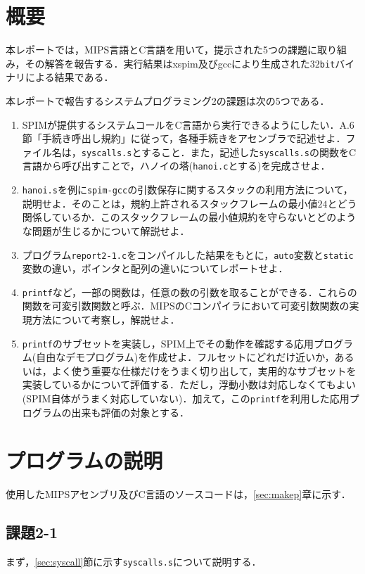 \section{概要} \label{sec:abstract}
本レポートでは，MIPS言語とC言語を用いて，提示された5つの課題に取り組み，その解答を報告する．実行結果はxspim及びgccにより生成された$32$\verb|bit|バイナリによる結果である．

本レポートで報告するシステムプログラミング2の課題は次の5つである．
\begin{enumerate}
\item SPIMが提供するシステムコールをC言語から実行できるようにしたい．A.6節「手続き呼出し規約」に従って，各種手続きをアセンブラで記述せよ．ファイル名は，\verb|syscalls.s|とすること．\cite{book:assembly}また，記述した\verb|syscalls.s|の関数をC言語から呼び出すことで，ハノイの塔(\verb|hanoi.c|とする)を完成させよ．
\item \verb|hanoi.s|を例に\verb|spim-gcc|の引数保存に関するスタックの利用方法について，説明せよ．そのことは，規約上許されるスタックフレームの最小値$24$とどう関係しているか．このスタックフレームの最小値規約を守らないとどのような問題が生じるかについて解説せよ．
\item プログラム\verb|report2-1.c|をコンパイルした結果をもとに，\verb|auto|変数と\verb|static|変数の違い，ポインタと配列の違いについてレポートせよ．
\item \verb|printf|など，一部の関数は，任意の数の引数を取ることができる．これらの関数を可変引数関数と呼ぶ．MIPSのCコンパイラにおいて可変引数関数の実現方法について考察し，解説せよ．
\item \verb|printf|のサブセットを実装し，SPIM上でその動作を確認する応用プログラム(自由なデモプログラム)を作成せよ．フルセットにどれだけ近いか，あるいは，よく使う重要な仕様だけをうまく切り出して，実用的なサブセットを実装しているかについて評価する．ただし，浮動小数は対応しなくてもよい(SPIM自体がうまく対応していない)．加えて，この\verb|printf|を利用した応用プログラムの出来も評価の対象とする．
\end{enumerate}


\section{プログラムの説明}\label{sec:capp}
使用したMIPSアセンブリ及びC言語のソースコードは，\ref{sec:makep}章に示す．

\subsection{課題2-1}
まず，\ref{sec:syscall}節に示す\verb|syscalls.s|について説明する．

